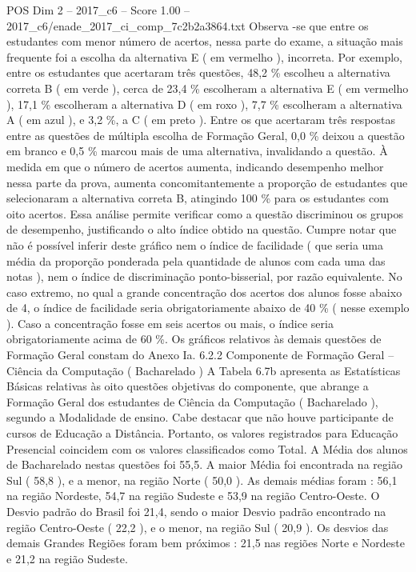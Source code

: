 \begin{textsample}{POS Dim 2 – 2017\_c6 – Score 1.00 – 2017\_c6/enade\_2017\_ci\_comp\_7c2b2a3864.txt}
Observa -se que entre os estudantes com menor número de acertos, nessa parte do exame, a situação mais frequente foi a escolha da alternativa E ( em vermelho ), incorreta.
Por exemplo, entre os estudantes que acertaram três questões, 48,2 \% escolheu a alternativa correta B ( em verde ), cerca de 23,4 \% escolheram a alternativa E ( em vermelho ), 17,1 \% escolheram a alternativa D ( em roxo ), 7,7 \% escolheram a alternativa A ( em azul ), e 3,2 \%, a C ( em preto ).
Entre os que acertaram três respostas entre as questões de múltipla escolha de Formação Geral, 0,0 \% deixou a questão em branco e 0,5 \% marcou mais de uma alternativa, invalidando a questão.
À medida em que o número de acertos aumenta, indicando desempenho melhor nessa parte da prova, aumenta concomitantemente a proporção de estudantes que selecionaram a alternativa correta B, atingindo 100 \% para os estudantes com oito acertos.
Essa análise permite verificar como a questão discriminou os grupos de desempenho, justificando o alto índice obtido na questão.
Cumpre notar que não é possível inferir deste gráfico nem o índice de facilidade ( que seria uma média da proporção ponderada pela quantidade de alunos com cada uma das notas ), nem o índice de discriminação ponto-bisserial, por razão equivalente.
No caso extremo, no qual a grande concentração dos acertos dos alunos fosse abaixo de 4, o índice de facilidade seria obrigatoriamente abaixo de 40 \% ( nesse exemplo ).
Caso a concentração fosse em seis acertos ou mais, o índice seria obrigatoriamente acima de 60 \%.
Os gráficos relativos às demais questões de Formação Geral constam do Anexo Ia. 6.2.2 Componente de Formação Geral – Ciência da Computação ( Bacharelado ) A Tabela 6.7b apresenta as Estatísticas Básicas relativas às oito questões objetivas do componente, que abrange a Formação Geral dos estudantes de Ciência da Computação ( Bacharelado ), segundo a Modalidade de ensino.
Cabe destacar que não houve participante de cursos de Educação a Distância.
Portanto, os valores registrados para Educação Presencial coincidem com os valores classificados como Total.
A Média dos alunos de Bacharelado nestas questões foi 55,5.
A maior Média foi encontrada na região Sul ( 58,8 ), e a menor, na região Norte ( 50,0 ).
As demais médias foram : 56,1 na região Nordeste, 54,7 na região Sudeste e 53,9 na região Centro-Oeste.
O Desvio padrão do Brasil foi 21,4, sendo o maior Desvio padrão encontrado na região Centro-Oeste ( 22,2 ), e o menor, na região Sul ( 20,9 ).
Os desvios das demais Grandes Regiões foram bem próximos : 21,5 nas regiões Norte e Nordeste e 21,2 na região Sudeste.

\end{textsample}
